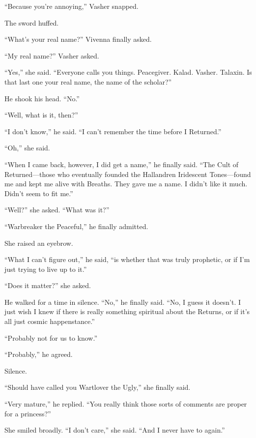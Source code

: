 “Because you’re annoying,” Vasher snapped.

The sword huffed.

“What’s your real name?” Vivenna finally asked.

“My real name?” Vasher asked.

“Yes,” she said. “Everyone calls you things. Peacegiver. Kalad. Vasher. Talaxin. Is that last one your real name, the name of the scholar?”

He shook his head. “No.”

“Well, what is it, then?”

“I don’t know,” he said. “I can’t remember the time before I Returned.”

“Oh,” she said.

“When I came back, however, I did get a name,” he finally said. “The Cult of Returned—those who eventually founded the Hallandren Iridescent Tones—found me and kept me alive with Breaths. They gave me a name. I didn’t like it much. Didn’t seem to fit me.”

“Well?” she asked. “What was it?”

“Warbreaker the Peaceful,” he finally admitted.

She raised an eyebrow.

“What I can’t figure out,” he said, “is whether that was truly prophetic, or if I’m just trying to live up to it.”

“Does it matter?” she asked.

He walked for a time in silence. “No,” he finally said. “No, I guess it doesn’t. I just wish I knew if there is really something spiritual about the Returns, or if it’s all just cosmic happenstance.”

“Probably not for us to know.”

“Probably,” he agreed.

Silence.

“Should have called you Wartlover the Ugly,” she finally said.

“Very mature,” he replied. “You really think those sorts of comments are proper for a princess?”

She smiled broadly. “I don’t care,” she said. “And I never have to again.”

